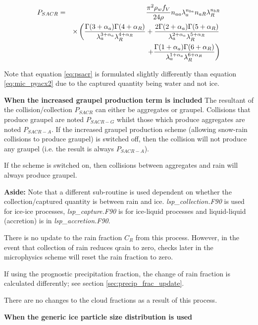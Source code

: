 \documentclass{UMDP_article}
\begin{document}
\begin{eqnarray}
P_{SACR}& =& 
\frac { \pi^{2} \rho_w f_V } {24 \rho } n_{aa} \lambda_a^{n_{ba}} n_{aR} 
\lambda_R^{n_{bR}} \nonumber \\
& & \times
\left(\frac{\Gamma(3+\alpha_a) \Gamma(4+\alpha_R)} 
{\lambda_a^{3+\alpha_a} \lambda_R^{4+\alpha_R}}
+ \frac{ 2 \Gamma(2+\alpha_a) \Gamma(5+\alpha_R) } 
{\lambda_a^{2+\alpha_a} \lambda_R^{5+\alpha_R}} \right. \nonumber \\
& & \left. \hspace{1.5cm}+ \frac{\Gamma(1+\alpha_a) 
\Gamma(6+\alpha_R)} { \lambda_a^{1+\alpha_a} \lambda_R^{6+\alpha_R} }
\right)
\label{eq:psacr}
\end{eqnarray}

Note that equation \ref{eq:psacr} is formulated slightly differently than equation 
\ref{eq:mic_pyacx2} due to the captured quantity being water and not ice.


\textbf{When the increased graupel production term is included}
The resultant of the collision/collection $P_{SACR}$ can either be aggregates 
or graupel. Collisions that produce graupel are noted $P_{SACR-G}$ whilst those
which produce aggregates are noted $P_{SACR-A}$. If the increased graupel 
production scheme (allowing snow-rain collisions to
produce graupel) is switched off, then the collision will not produce any graupel 
(i.e. the result is always $P_{SACR-A}$). 

If the scheme is switched on, then collisions between aggregates and rain will 
always produce graupel.
 
\textbf{Aside:} Note that a different sub-routine is used dependent on
whether the collection/captured quantity is between rain and ice. 
\textit{lsp\_collection.F90} is used for ice-ice processes, 
\textit{lsp\_capture.F90} is for ice-liquid processes and liquid-liquid 
(accretion) is in \textit{lsp\_accretion.F90}.

There is no update to the rain fraction $C_R$ from this process.
However, in the event that collection of rain reduces qrain to zero,
checks later in the microphysics scheme will reset the rain fraction to zero.

If using the prognostic precipitation fraction, the change of rain fraction
is calculated differently; see section \ref{sec:precip_frac_update}.

There are no changes to the cloud fractions
as a result of this process.

\textbf{When the generic ice particle size distribution is used}
\end{document}
